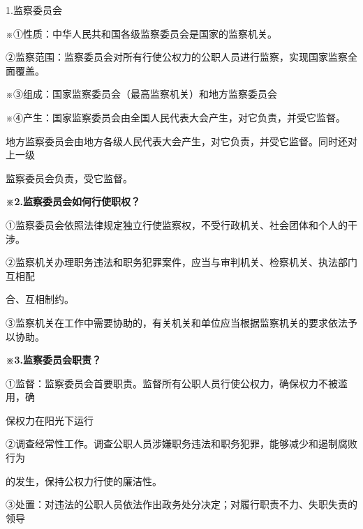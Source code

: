 \documentclass[lang=cn,11pt]{elegantbook}
\newcommand{\daofasym}[1]{{\daofasymbolfont #1}}
\newcommand{\daofasym}[1]{#1}
\begin{document}
1.监察委员会\par

※\daofasym{①}性质：中华人民共和国各级监察委员会是国家的监察机关。\par

\daofasym{②}监察范围：监察委员会对所有行使公权力的公职人员进行监察，实现国家监察全面覆盖。\par

※\daofasym{③}组成：国家监察委员会（最高监察机关）和地方监察委员会\par

※\daofasym{④}产生：国家监察委员会由全国人民代表大会产生，对它负责，并受它监督。\par

地方监察委员会由地方各级人民代表大会产生，对它负责，并受它监督。同时还对上一级\par

监察委员会负责，受它监督。\par

\textbf{※2.监察委员会如何行使职权？}\par

\daofasym{①}监察委员会依照法律规定独立行使监察权，不受行政机关、社会团体和个人的干涉。\par

\daofasym{②}监察机关办理职务违法和职务犯罪案件，应当与审判机关、检察机关、执法部门互相配\par

合、互相制约。\par

\daofasym{③}监察机关在工作中需要协助的，有关机关和单位应当根据监察机关的要求依法予以协助。\par

\textbf{※3.监察委员会职责？}\par

\daofasym{①}监督：监察委员会首要职责。监督所有公职人员行使公权力，确保权力不被滥用，确\par

保权力在阳光下运行\par

\daofasym{②}调查经常性工作。调查公职人员涉嫌职务违法和职务犯罪，能够减少和遏制腐败行为\par

的发生，保持公权力行使的廉洁性。\par

\daofasym{③}处置：对违法的公职人员依法作出政务处分决定；对履行职责不力、失职失责的领导\par
\end{document}
